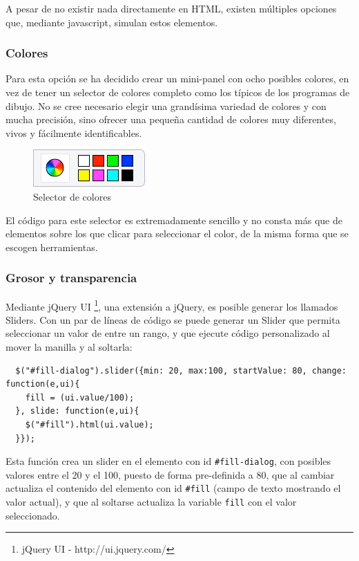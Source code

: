 A pesar de no existir nada directamente en HTML, existen múltiples opciones que, mediante javascript, simulan estos elementos.

\subsubsection{Colores} %
\label{ssub:colores}
Para esta opción se ha decidido crear un mini-panel con ocho posibles colores, en vez de tener un selector de colores completo como los típicos de los programas de dibujo. No se cree necesario elegir una grandísima variedad de colores y con mucha precisión, sino ofrecer una pequeña cantidad de colores muy diferentes, vivos y fácilmente identificables.

\begin{figure}[h!]
\centering
\includegraphics{color_selector.png}
\caption{Selector de colores}\label{fig:color_selector}
\end{figure}

El código para este selector es extremadamente sencillo y no consta más que de elementos sobre los que clicar para seleccionar el color, de la misma forma que se escogen herramientas.
\subsubsection{Grosor y transparencia} %
\label{ssub:grosor_y_transparencia}
Mediante jQuery UI \footnote{jQuery UI - http://ui.jquery.com/}, una extensión a jQuery, es posible generar los llamados Sliders. Con un par de líneas de código se puede generar un Slider que permita seleccionar un valor de entre un rango, y que ejecute código personalizado al mover la manilla y al soltarla:
\begin{verbatim}
  $("#fill-dialog").slider({min: 20, max:100, startValue: 80, change: function(e,ui){
    fill = (ui.value/100);
  }, slide: function(e,ui){
    $("#fill").html(ui.value);
  }});
\end{verbatim}
Esta función crea un slider en el elemento con id \texttt{\#fill-dialog}, con posibles valores entre el 20 y el 100, puesto de forma pre-definida a 80, que al cambiar actualiza el contenido del elemento con id \texttt{\#fill} (campo de texto mostrando el valor actual), y que al soltarse actualiza la variable \texttt{fill} con el valor seleccionado.

